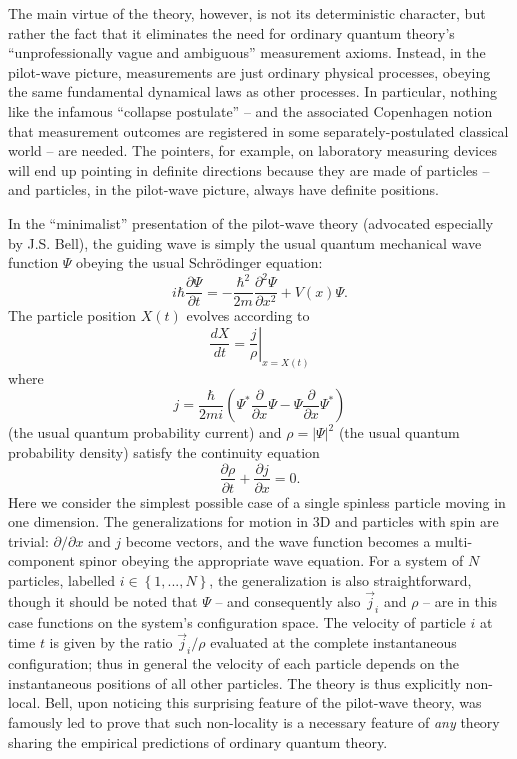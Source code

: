 \documentclass[aps,prc,twocolumn,letterpaper,floatfix]{revtex4}
\begin{document}
The main virtue of the theory, however, is not its deterministic
character, but rather the fact that it eliminates the need for
ordinary quantum theory's 
``unprofessionally vague and ambiguous'' measurement axioms.
\cite{bellqft}   Instead, in the
pilot-wave picture, measurements are just ordinary physical processes,
obeying the same fundamental dynamical laws as other processes.  In
particular, nothing like the infamous ``collapse postulate'' -- and the associated
Copenhagen notion that measurement outcomes are registered in some
separately-postulated classical world -- are needed.  The pointers, for
example, on laboratory measuring devices will end up pointing in
definite directions because they are made of particles -- and
particles, in the pilot-wave picture, always have definite positions.

In the ``minimalist'' presentation of the pilot-wave theory
(advocated especially by J.S. Bell), the guiding wave is simply the
usual quantum mechanical wave function $\Psi$ 
obeying the usual Schr\"odinger equation:
\begin{equation}
i \hbar \frac{\partial \Psi}{\partial t} = - \frac{\hbar^2}{2m}
\frac{\partial^2 \Psi}{\partial x^2} + V(x) \Psi.
\end{equation}
The particle position $X(t)$ evolves according to
\begin{equation}
\frac{dX}{dt} = \left. \frac{j}{\rho} \right|_{x=X(t)} 
\label{dBBvel}
\end{equation}
where 
\begin{equation}
j = \frac{\hbar}{2mi}(\Psi^* \frac{\partial}{\partial x} \Psi - \Psi
\frac{\partial}{\partial x} \Psi^*)
\label{jdef}
\end{equation}
(the usual quantum probability current) and  $\rho = |\Psi|^2$
(the usual quantum probability density) satisfy the continuity
equation
\begin{equation}
\frac{\partial \rho}{\partial t} + \frac{\partial j}{\partial x}  = 0.
\label{continuity}
\end{equation}
Here we consider the simplest possible case of a single spinless particle
moving in one dimension.  The generalizations for motion in 3D and
particles with spin are trivial:  $\partial/\partial x$ and $j$ become
vectors, and the wave function becomes a multi-component
spinor obeying the appropriate wave equation.  For a system of $N$
particles, labelled $i \in \left\{1, ..., N\right\}$,
the generalization is also straightforward, though it should be noted
that $\Psi$ -- and consequently also $\vec{j}_i$ and $\rho$ -- are in this case
functions on the system's configuration space.  The velocity of particle $i$ at
time $t$ is given by the ratio $\vec{j}_i / \rho$ evaluated at the complete
instantaneous configuration; thus in general the velocity of each
particle depends on the instantaneous positions of all other
particles.  The theory is thus explicitly non-local.  Bell, upon
noticing this surprising feature of the pilot-wave theory, was
famously led to
prove that such non-locality is a necessary feature of \emph{any} theory
sharing the empirical predictions of ordinary quantum
theory. \cite{belltheorem}
\end{document}
